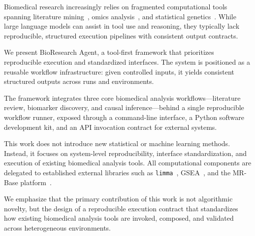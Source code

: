 Biomedical research increasingly relies on fragmented computational tools spanning literature mining~\cite{sayers2021ncbi}, omics analysis~\cite{ritchie2015limma,subramanian2005gsea}, and statistical genetics~\cite{hemani2018mrbase,hartwig2017mr}. While large language models can assist in tool use and reasoning, they typically lack reproducible, structured execution pipelines with consistent output contracts.

We present BioResearch Agent, a tool-first framework that prioritizes reproducible execution and standardized interfaces. The system is positioned as a reusable workflow infrastructure: given controlled inputs, it yields consistent structured outputs across runs and environments.

The framework integrates three core biomedical analysis workflows---literature review, biomarker discovery, and causal inference---behind a single reproducible workflow runner, exposed through a command-line interface, a Python software development kit, and an API invocation contract for external systems.

This work does not introduce new statistical or machine learning methods. Instead, it focuses on system-level reproducibility, interface standardization, and execution of existing biomedical analysis tools. All computational components are delegated to established external libraries such as \texttt{limma}~\cite{ritchie2015limma}, GSEA~\cite{subramanian2005gsea}, and the MR-Base platform~\cite{hemani2018mrbase}.

We emphasize that the primary contribution of this work is not algorithmic novelty, but the design of a reproducible execution contract that standardizes how existing biomedical analysis tools are invoked, composed, and validated across heterogeneous environments.
